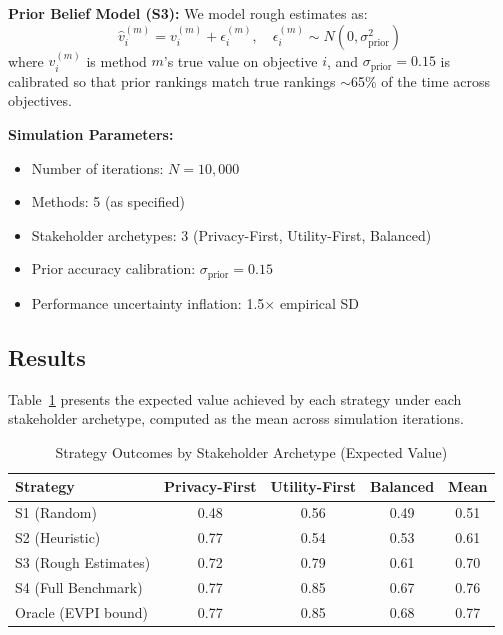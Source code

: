 \documentclass[12pt,a4paper]{article}
\begin{document}
\textbf{Prior Belief Model (S3):} We model rough estimates as:
\begin{equation}
\hat{v}_i^{(m)} = v_i^{(m)} + \epsilon_i^{(m)}, \quad \epsilon_i^{(m)} \sim N(0, \sigma_{\text{prior}}^2)
\end{equation}
where $v_i^{(m)}$ is method $m$'s true value on objective $i$, and $\sigma_{\text{prior}} = 0.15$ is calibrated so that prior rankings match true rankings $\sim$65\% of the time across objectives.

\textbf{Simulation Parameters:}
\begin{itemize}
    \item Number of iterations: $N = 10{,}000$
    \item Methods: 5 (as specified)
    \item Stakeholder archetypes: 3 (Privacy-First, Utility-First, Balanced)
    \item Prior accuracy calibration: $\sigma_{\text{prior}} = 0.15$
    \item Performance uncertainty inflation: 1.5$\times$ empirical SD
\end{itemize}

\subsection{Results}

Table~\ref{tab:strategy} presents the expected value achieved by each strategy under each stakeholder archetype, computed as the mean across simulation iterations.

\begin{table}[htbp]
\centering
\caption{Strategy Outcomes by Stakeholder Archetype (Expected Value)}
\label{tab:strategy}
\begin{tabular}{@{}lcccc@{}}
\toprule
\textbf{Strategy} & \textbf{Privacy-First} & \textbf{Utility-First} & \textbf{Balanced} & \textbf{Mean} \\
\midrule
S1 (Random) & 0.48 & 0.56 & 0.49 & 0.51 \\
S2 (Heuristic) & 0.77 & 0.54 & 0.53 & 0.61 \\
S3 (Rough Estimates) & 0.72 & 0.79 & 0.61 & 0.70 \\
S4 (Full Benchmark) & 0.77 & 0.85 & 0.67 & 0.76 \\
\midrule
Oracle (EVPI bound) & 0.77 & 0.85 & 0.68 & 0.77 \\
\bottomrule
\end{tabular}
\end{table}
\end{document}
